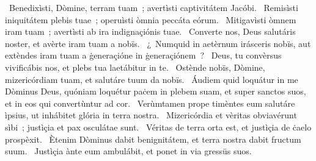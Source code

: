 ~Benedixìsti, Dòmine, terram tuam~; avertìsti captivitátem Jacóbi. 
~Remisìsti iniquitátem plebis tuae~; operuìsti òmnia peccáta eórum. 
~Mitigavìsti òmnem iram tuam~; avertìsti ab ira indignaçiónis tuae. 
~Converte nos, Deus salutáris noster, et avèrte iram tuam a nobïs. 
~¿~Numquid in aetèrnum irásceris nobïs, aut extèndes iram tuam a ġeneraçióne in ġeneraçiónem~? 
~Deus, tu convèrsus vivificábis nos, et plebs tua laetábitur in te. 
~Ostènde nobïs, Dòmine, mizericórdiam tuam, et salutáre tuum da nobïs. 
~Áudiem quid loquátur in me Dòminus Deus, quóniam loquétur paċem in plebem suam, et super sanctos suos, et in eos qui convertùntur ad cor. 
~Verùmtamen prope timèntes eum salutáre ìpsius, ut inhábitet glória in terra nostra. 
~Mizericórdia et vèritas obviavérunt sìbi~; justìçia et pax osculátae sunt. 
~Véritas de terra orta est, et justìçia de ċaelo prospèxit. 
~Ètenim Dòminus dabit benignitátem, et terra nostra dabit fructum suum. 
~Justìçia ànte eum ambulábit, et ponet in via gressüs suos. 

